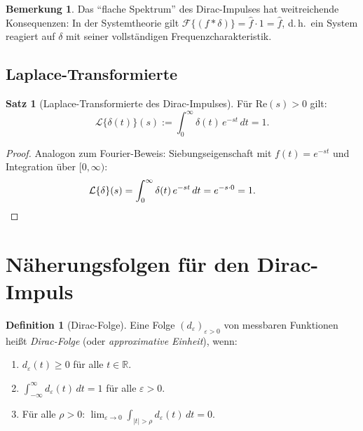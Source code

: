 ﻿\documentclass[a4paper,12pt]{article}
\theoremstyle{definition}
\newtheorem{definition}{Definition}
\newtheorem{satz}{Satz}
\newtheorem{bemerkung}{Bemerkung}
\begin{document}
\begin{bemerkung}
Das ``flache Spektrum'' des Dirac-Impulses hat weitreichende Konsequenzen:
In der Systemtheorie gilt $\mathcal{F}\{(f * \delta)\} = \hat{f} \cdot 1 = \hat{f}$,
d.\,h.\ ein System reagiert auf $\delta$ mit seiner vollst\"andigen Frequenz\-charakteristik.
\end{bemerkung}

\subsection{Laplace-Transformierte}

\begin{satz}[Laplace-Transformierte des Dirac-Impulses]
\label{satz:laplace}
F\"ur $\mathrm{Re}(s) > 0$ gilt:
\[
\mathcal{L}\{\delta(t)\}(s) := \int_{0}^{\infty} \delta(t)\,e^{-st}\,dt = 1.
\]
\end{satz}

\begin{proof}
Analogon zum Fourier-Beweis: Siebungseigenschaft mit $f(t) = e^{-st}$ und Integration
\"uber $[0, \infty)$:
\[
\mathcal{L}\{\delta\}(s)
= \int_{0}^{\infty} \delta(t)\,e^{-st}\,dt = e^{-s \cdot 0} = 1. \qquad \qedhere
\]
\end{proof}

\section{N\"aherungsfolgen f\"ur den Dirac-Impuls}
\label{sec:naherungen}

\begin{definition}[Dirac-Folge]
Eine Folge $(d_\varepsilon)_{\varepsilon > 0}$ von messbaren Funktionen hei{\ss}t
\emph{Dirac-Folge} (oder \emph{approximative Einheit}), wenn:
\begin{enumerate}[label=(\alph*)]
    \item $d_\varepsilon(t) \geq 0$ f\"ur alle $t \in \mathbb{R}$.
    \item $\displaystyle\int_{-\infty}^{\infty} d_\varepsilon(t)\,dt = 1$ f\"ur alle $\varepsilon > 0$.
    \item F\"ur alle $\rho > 0$: $\displaystyle\lim_{\varepsilon \to 0}
          \int_{|t| > \rho} d_\varepsilon(t)\,dt = 0$.
\end{enumerate}
\end{definition}
\end{document}
